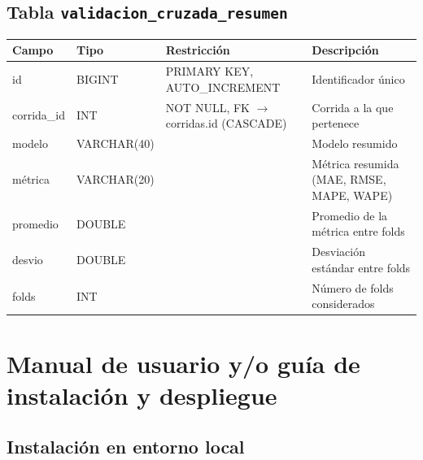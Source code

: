 \subsection*{Tabla \texttt{validacion\_cruzada\_resumen}}
\begin{table}[H]
\centering
\renewcommand{\arraystretch}{1.3}
\begin{tabularx}{\textwidth}{|>{\raggedright\arraybackslash}p{3.0cm}|l|>{\raggedright\arraybackslash}p{3.2cm}|X|}
\hline
\textbf{Campo} & \textbf{Tipo} & \textbf{Restricción} & \textbf{Descripción} \\
\hline
id & BIGINT & PRIMARY KEY, AUTO\_\discretionary{}{}{}INCREMENT & Identificador único \\
\hline
corrida\_\discretionary{}{}{}id & INT & NOT NULL, FK $\to$ corridas.id (CASCADE) & Corrida a la que pertenece \\
\hline
modelo & VARCHAR(40) & & Modelo resumido \\
\hline
métrica & VARCHAR(20) & & Métrica resumida (MAE, RMSE, MAPE, WAPE) \\
\hline
promedio & DOUBLE & & Promedio de la métrica entre folds \\
\hline
desvio & DOUBLE & & Desviación estándar entre folds \\
\hline
folds & INT & & Número de folds considerados \\
\hline
\end{tabularx}
\end{table}

\section{Manual de usuario y/o guía de instalación y despliegue}

\subsection*{Instalación en entorno local}

